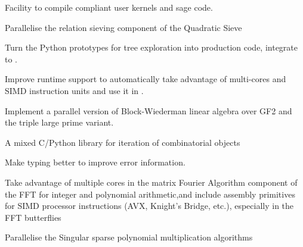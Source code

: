 \begin{workpackage}
\begin{tasklist}
\end{tasklist}
\begin{wpdelivs}
  \begin{wpdeliv}[due=3,id=pythran-sage,dissem=PU,nature=DEM]
      {Facility to compile \Pythran compliant user kernels and sage code.}
  \end{wpdeliv}
  \begin{wpdeliv}[due=3,id=QS-sieving,dissem=PU,nature=DEM]
      {Parallelise the relation sieving component of the Quadratic Sieve}
  \end{wpdeliv}
  \begin{wpdeliv}[due=3,id=HPCcombi,dissem=PU,nature=DEM]
      {Turn the Python prototypes for tree exploration into production code, integrate to \Sage.}
  \end{wpdeliv}
  \begin{wpdeliv}[due=9,id=pythran-cython,dissem=PU,nature=DEM]
      {Improve \Pythran runtime support to automatically take advantage of multi-cores and SIMD instruction units and use it in \Cython.}
  \end{wpdeliv}
  \begin{wpdeliv}[due=9,id=QS-linalg,dissem=PU,nature=DEM]
      {Implement a parallel version of Block-Wiederman linear algebra over GF2 and the triple large prime variant.}
  \end{wpdeliv}
  \begin{wpdeliv}[due=12,id=HPCcombi,dissem=PU,nature=DEM,lead=UB]
      {A mixed C/Python library for iteration of combinatorial objects}
  \end{wpdeliv}
  \begin{wpdeliv}[due=12,id=pythran-typing,dissem=PU,nature=DEM]
      {Make \Pythran typing better to improve error information.}
  \end{wpdeliv}
  \begin{wpdeliv}[due=12,id=FFT,dissem=PU,nature=DEM]
    {Take advantage of multiple cores in the matrix Fourier Algorithm component of the FFT
      for integer and polynomial arithmetic,and include assembly primitives for SIMD
      processor instructions (AVX, Knight's Bridge, etc.), especially in the FFT
      butterflies}
  \end{wpdeliv}
  \begin{wpdeliv}[due=12,id=singular-polymul,dissem=PU,nature=DEM]
      {Parallelise the Singular sparse polynomial multiplication algorithms}
  \end{wpdeliv}
  \begin{wpdeliv}[due=12,id=singular-polyarith,dissem=PU,nature=DEM]

\end{wpdeliv}
\end{wpdelivs}
\end{workpackage}
